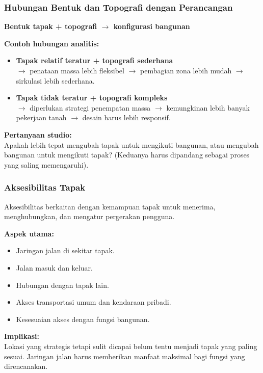 \documentclass[../main.tex]{subfiles}
\begin{document}
\begin{frame}[mytitle=standard, c, mycolor=digiPH_white, light]
	\frametitle{Hubungan Bentuk dan Topografi dengan Perancangan}

	\textbf{Bentuk tapak + topografi $\rightarrow$ konfigurasi bangunan}

	\vspace{0.3cm}
	\textbf{Contoh hubungan analitis:}
	\begin{itemize}
		\item \textbf{Tapak relatif teratur + topografi sederhana}\\
		      $\rightarrow$ penataan massa lebih fleksibel $\rightarrow$ pembagian zona lebih mudah $\rightarrow$ sirkulasi lebih sederhana.
		\item \textbf{Tapak tidak teratur + topografi kompleks}\\
		      $\rightarrow$ diperlukan strategi penempatan massa $\rightarrow$ kemungkinan lebih banyak pekerjaan tanah $\rightarrow$ desain harus lebih responsif.
	\end{itemize}

	\vspace{0.3cm}
	\textbf{Pertanyaan studio:}\\
	Apakah lebih tepat mengubah tapak untuk mengikuti bangunan, atau mengubah bangunan untuk mengikuti tapak? (Keduanya harus dipandang sebagai proses yang saling memengaruhi).
\end{frame}

\begin{frame}[mytitle=center, c, mycolor=digiPH_navyblue, dark]
	\frametitle{Aksesibilitas Tapak}

	Aksesibilitas berkaitan dengan kemampuan tapak untuk menerima, menghubungkan, dan mengatur pergerakan pengguna.

	\vspace{0.3cm}
	\textbf{Aspek utama:}
	\begin{itemize}
		\item Jaringan jalan di sekitar tapak.
		\item Jalan masuk dan keluar.
		\item Hubungan dengan tapak lain.
		\item Akses transportasi umum dan kendaraan pribadi.
		\item Kesesuaian akses dengan fungsi bangunan.
	\end{itemize}

	\vspace{0.3cm}
	\textbf{Implikasi:}\\
	Lokasi yang strategis tetapi sulit dicapai belum tentu menjadi tapak yang paling sesuai. Jaringan jalan harus memberikan manfaat maksimal bagi fungsi yang direncanakan.
\end{frame}
\end{document}
